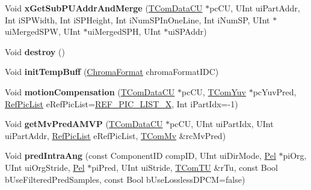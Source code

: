 \begin{DoxyCompactItemize}
Void {\bfseries x\+Get\+Sub\+P\+U\+Addr\+And\+Merge} (\hyperlink{class_t_com_data_c_u}{T\+Com\+Data\+CU} $\ast$pc\+CU, U\+Int ui\+Part\+Addr, Int i\+S\+P\+Width, Int i\+S\+P\+Height, Int i\+Num\+S\+P\+In\+One\+Line, Int i\+Num\+SP, U\+Int $\ast$ui\+Merged\+S\+PW, U\+Int $\ast$ui\+Merged\+S\+PH, U\+Int $\ast$ui\+S\+P\+Addr)
\item 
\mbox{\label{class_t_com_prediction_a9b96e2800ce97c8c34636dee0c7e98fa}} 
Void {\bfseries destroy} ()
\item 
\mbox{\label{class_t_com_prediction_a03373e23889fecf4fb2e41f629cd7000}} 
Void {\bfseries init\+Temp\+Buff} (\hyperlink{_type_def_8h_a4a6c51c10f2eb04abc7209db7caff39f}{Chroma\+Format} chroma\+Format\+I\+DC)
\item 
\mbox{\label{class_t_com_prediction_a81590583e0fa897d8257659323bc1924}} 
Void {\bfseries motion\+Compensation} (\hyperlink{class_t_com_data_c_u}{T\+Com\+Data\+CU} $\ast$pc\+CU, \hyperlink{class_t_com_yuv}{T\+Com\+Yuv} $\ast$pc\+Yuv\+Pred, \hyperlink{_type_def_8h_a93cea48eb9dcfd661168dee82e41b384}{Ref\+Pic\+List} e\+Ref\+Pic\+List=\hyperlink{_type_def_8h_a93cea48eb9dcfd661168dee82e41b384a4750af3c3dcdffb256d98e4ad103e675}{R\+E\+F\+\_\+\+P\+I\+C\+\_\+\+L\+I\+S\+T\+\_\+X}, Int i\+Part\+Idx=-\/1)
\item 
\mbox{\label{class_t_com_prediction_acb7359806133d2280dc421d5eafe4d2e}} 
Void {\bfseries get\+Mv\+Pred\+A\+M\+VP} (\hyperlink{class_t_com_data_c_u}{T\+Com\+Data\+CU} $\ast$pc\+CU, U\+Int ui\+Part\+Idx, U\+Int ui\+Part\+Addr, \hyperlink{_type_def_8h_a93cea48eb9dcfd661168dee82e41b384}{Ref\+Pic\+List} e\+Ref\+Pic\+List, \hyperlink{class_t_com_mv}{T\+Com\+Mv} \&rc\+Mv\+Pred)
\item 
\mbox{\label{class_t_com_prediction_a0a599de6e25e450a1a0b59c96f18d590}} 
Void {\bfseries pred\+Intra\+Ang} (const Component\+ID comp\+ID, U\+Int ui\+Dir\+Mode, \hyperlink{_type_def_8h_af92141699657699b4b547be0c8517541}{Pel} $\ast$pi\+Org, U\+Int ui\+Org\+Stride, \hyperlink{_type_def_8h_af92141699657699b4b547be0c8517541}{Pel} $\ast$pi\+Pred, U\+Int ui\+Stride, \hyperlink{class_t_com_t_u}{T\+Com\+TU} \&r\+Tu, const Bool b\+Use\+Filtered\+Pred\+Samples, const Bool b\+Use\+Lossless\+D\+P\+CM=false)
\item 

\end{DoxyCompactItemize}
